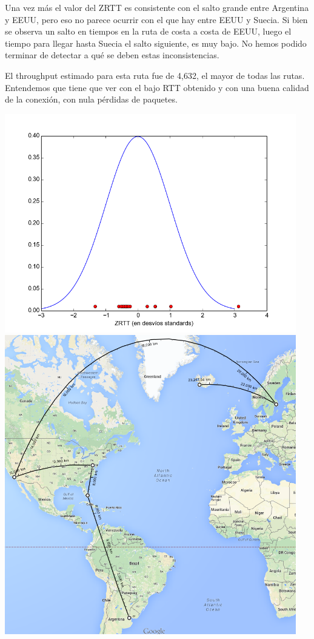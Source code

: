 Una vez más el valor del ZRTT es consistente con el salto grande entre Argentina y EEUU, pero eso no parece ocurrir con el que hay entre EEUU y Suecia.
Si bien se observa un salto en tiempos en la ruta de costa a costa de EEUU, luego el tiempo para llegar hasta Suecia el salto siguiente, es muy bajo.
No hemos podido terminar de detectar a qué se deben estas inconsistencias.


El throughput estimado para esta ruta fue de 4,632, el mayor de todas las rutas. Entendemos que tiene que ver con el bajo RTT obtenido y con una buena calidad de la conexión, con nula pérdidas de paquetes.

\includegraphics[width=5in]{imgs/iceland_dist.png}
\includegraphics[width=5in]{imgs/maps/iceland2.png}



